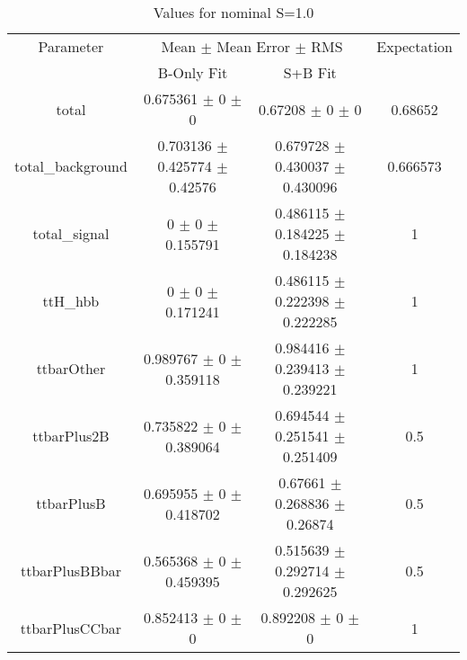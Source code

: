 \begin{table}
\centering
\caption{Values for nominal S=1.0}
\begin{tabular}{cccc}
\toprule
Parameter & \multicolumn{2}{c}{Mean $\pm$ Mean Error $\pm$ RMS} & Expectation\\
 & B-Only Fit & S+B Fit & \\
\midrule
total & \num{0.675361} $\pm$ \num{0} $\pm$ \num{0} & \num{0.67208} $\pm$ \num{0} $\pm$ \num{0} & \num{0.68652}\\
total\_background & \num{0.703136} $\pm$ \num{0.425774} $\pm$ \num{0.42576} & \num{0.679728} $\pm$ \num{0.430037} $\pm$ \num{0.430096} & \num{0.666573}\\
total\_signal & \num{0} $\pm$ \num{0} $\pm$ \num{0.155791} & \num{0.486115} $\pm$ \num{0.184225} $\pm$ \num{0.184238} & \num{1}\\
ttH\_hbb & \num{0} $\pm$ \num{0} $\pm$ \num{0.171241} & \num{0.486115} $\pm$ \num{0.222398} $\pm$ \num{0.222285} & \num{1}\\
ttbarOther & \num{0.989767} $\pm$ \num{0} $\pm$ \num{0.359118} & \num{0.984416} $\pm$ \num{0.239413} $\pm$ \num{0.239221} & \num{1}\\
ttbarPlus2B & \num{0.735822} $\pm$ \num{0} $\pm$ \num{0.389064} & \num{0.694544} $\pm$ \num{0.251541} $\pm$ \num{0.251409} & \num{0.5}\\
ttbarPlusB & \num{0.695955} $\pm$ \num{0} $\pm$ \num{0.418702} & \num{0.67661} $\pm$ \num{0.268836} $\pm$ \num{0.26874} & \num{0.5}\\
ttbarPlusBBbar & \num{0.565368} $\pm$ \num{0} $\pm$ \num{0.459395} & \num{0.515639} $\pm$ \num{0.292714} $\pm$ \num{0.292625} & \num{0.5}\\
ttbarPlusCCbar & \num{0.852413} $\pm$ \num{0} $\pm$ \num{0} & \num{0.892208} $\pm$ \num{0} $\pm$ \num{0} & \num{1}\\
\bottomrule
\end{tabular}
\end{table}